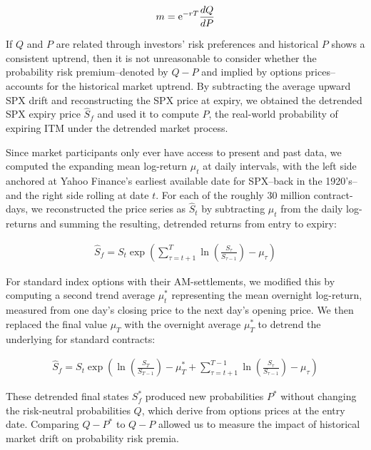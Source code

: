 \documentclass[final,3p,times,authoryear]{elsarticle}
\begin{document}
    \begin{align}
      m = {\rm e}^{-r T} \frac{dQ}{dP}
    \end{align}

    If $Q$ and $P$ are related through investors' risk preferences and historical $P$ shows a consistent uptrend, then it is not unreasonable to consider whether the probability risk premium--denoted by $Q-P$ and implied by options prices--accounts for the historical market uptrend. By subtracting the average upward SPX drift and reconstructing the SPX price at expiry, we obtained the detrended SPX expiry price $\hat{S}_f$ and used it to compute $\hat{P}$, the real-world probability of expiring ITM under the detrended market process.

    Since market participants only ever have access to present and past data, we computed the expanding mean log-return $\mu_t$ at daily intervals, with the left side anchored at Yahoo Finance's earliest available date for SPX--back in the 1920's-- and the right side rolling at date $t$. For each of the roughly 30 million contract-days, we reconstructed the price series as $\hat{S}_t$ by subtracting $\mu_t$ from the daily log-returns and summing the resulting, detrended returns from entry to expiry:

    \begin{align}
      \hat{S}_f = S_t \exp{
        \left(\displaystyle \sum_{\tau=t+1}^{T}{
          \ln{
            \left(\frac{S_\tau}{S_{\tau-1}}\right)
          } - \mu_\tau
        }\right)
      }
    \end{align}

    For standard index options with their AM-settlements, we modified this by computing a second trend average $\mu_t^\ast$ representing the mean overnight log-return, measured from one day's closing price to the next day's opening price. We then replaced the final value $\mu_T$ with the overnight average $\mu_T^\ast$ to detrend the underlying for standard contracts:

    \begin{align}
      \hat{S}_f = S_t \exp{
        \left(
          \ln{
            \left(\frac{S_T}{S_{T-1}}\right)
          } - \mu_T^\ast +
          \displaystyle \sum_{\tau=t+1}^{T-1}{
          \ln{
            \left(\frac{S_\tau}{S_{\tau-1}}\right)
          } - \mu_\tau
        }\right)
      }
    \end{align}

    These detrended final states $S_f^\ast$ produced new probabilities $P^\ast$ without changing the risk-neutral probabilities $Q$, which derive from options prices at the entry date. Comparing $Q-P^\ast$ to $Q-P$ allowed us to measure the impact of historical market drift on probability risk premia.
\end{document}
